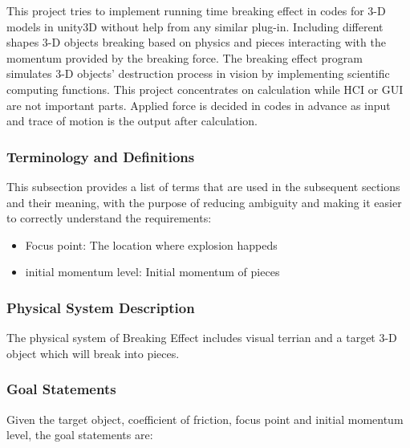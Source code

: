 \documentclass[12pt]{article}
\newcommand{\progname}{Breaking Effect} %
\begin{document}
This project tries to implement running time breaking effect in codes for 3-D models in unity3D without help from any similar plug-in. Including different shapes 3-D objects breaking based on physics and pieces interacting with the momentum provided by the breaking force. The breaking effect program simulates 3-D objects’ destruction process in vision by implementing scientific computing functions. This project concentrates on calculation while HCI or GUI are not important parts. Applied force is decided in codes in advance as input and trace of motion is the output after calculation.

\subsubsection{Terminology and  Definitions}

This subsection provides a list of terms that are used in the subsequent
sections and their meaning, with the purpose of reducing ambiguity and making it
easier to correctly understand the requirements:

\begin{itemize}

\item Focus point: The location where explosion happeds
\item initial momentum level: Initial momentum of pieces  

\end{itemize}

\subsubsection{Physical System Description}

The physical system of \progname{} includes visual terrian and a target 3-D object which will break into pieces.


\subsubsection{Goal Statements}

\noindent Given the target object, coefficient of friction, focus point and initial momentum level, the goal statements are:
\end{document}
